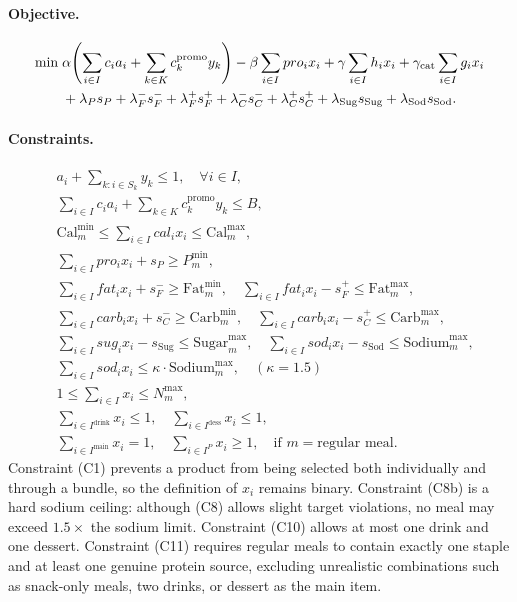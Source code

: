 \documentclass[a4paper]{article}
\begin{document}
\paragraph{Objective.}\leavevmode
\begin{align}
\min\;& \alpha\!\left(\sum_{i\in I} c_i a_i + \sum_{k\in K} c_k^{\text{promo}} y_k\right) - \beta\sum_{i\in I} pro_i x_i + \gamma\sum_{i\in I} h_i x_i + \gamma_{\text{cat}}\sum_{i\in I} g_i x_i \notag\\
& + \lambda_P s_P + \lambda^-_{F} s^-_{F} + \lambda^+_{F} s^+_{F} + \lambda^-_{C} s^-_{C} + \lambda^+_{C} s^+_{C} + \lambda_{\text{Sug}} s_{\text{Sug}} + \lambda_{\text{Sod}} s_{\text{Sod}}. \label{eq:obj}
\end{align}

\paragraph{Constraints.}\leavevmode
\begin{align}
&a_i + \sum_{k:i\in S_k} y_k \le 1, \quad \forall i \in I, \tag{C1: mutual exclusivity}\\
&\sum_{i\in I} c_i a_i + \sum_{k\in K} c_k^{\text{promo}} y_k \le B, \tag{C2: budget}\\
&\text{Cal}^{\min}_m \le \sum_{i\in I} cal_i x_i \le \text{Cal}^{\max}_m, \tag{C3: calorie range, hard}\\
&\sum_{i\in I} pro_i x_i + s_P \ge P^{\min}_m, \tag{C4: protein, soft}\\
&\sum_{i\in I} fat_i x_i + s^-_{F} \ge \text{Fat}^{\min}_m,\quad \sum_{i\in I} fat_i x_i - s^+_{F} \le \text{Fat}^{\max}_m, \tag{C5: fat, soft}\\
&\sum_{i\in I} carb_i x_i + s^-_{C} \ge \text{Carb}^{\min}_m,\quad \sum_{i\in I} carb_i x_i - s^+_{C} \le \text{Carb}^{\max}_m, \tag{C6: carbohydrates, soft}\\
&\sum_{i\in I} sug_i x_i - s_{\text{Sug}} \le \text{Sugar}^{\max}_m, \quad \sum_{i\in I} sod_i x_i - s_{\text{Sod}} \le \text{Sodium}^{\max}_m, \tag{C7--8: sugar/sodium, soft}\\
&\sum_{i\in I} sod_i x_i \le \kappa\cdot \text{Sodium}^{\max}_m, \quad (\kappa = 1.5) \tag{C8b: hard sodium cap}\\
&1 \le \sum_{i\in I} x_i \le N^{\max}_m, \tag{C9: item count}\\
&\sum_{i\in I^{\mathrm{drink}}} x_i \le 1, \quad \sum_{i\in I^{\mathrm{dess}}} x_i \le 1, \tag{C10: meal structure}\\
&\sum_{i\in I^{\mathrm{main}}} x_i = 1, \quad \sum_{i\in I^{P}} x_i \ge 1, \quad \text{if } m = \text{regular meal}. \tag{C11: staple + protein}
\end{align}
Constraint (C1) prevents a product from being selected both individually and through a bundle, so the definition of $x_i$ remains binary. Constraint (C8b) is a hard sodium ceiling: although (C8) allows slight target violations, no meal may exceed $1.5\times$ the sodium limit. Constraint (C10) allows at most one drink and one dessert. Constraint (C11) requires regular meals to contain exactly one staple and at least one genuine protein source, excluding unrealistic combinations such as snack-only meals, two drinks, or dessert as the main item.
\end{document}
